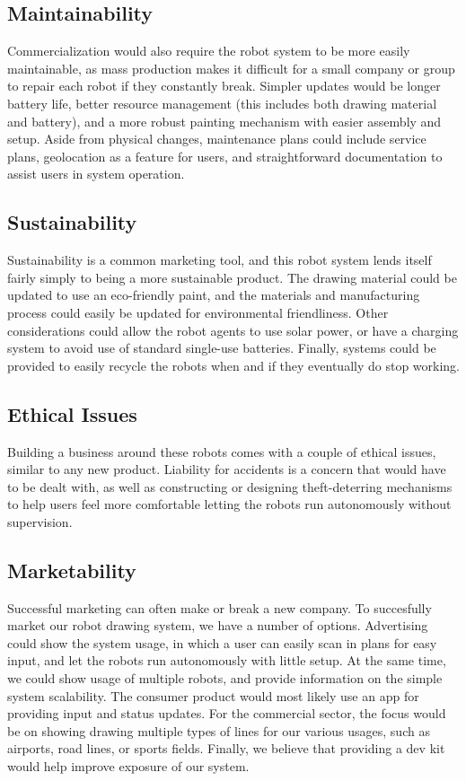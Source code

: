 \subsection{Maintainability}
Commercialization would also require the robot system to be more easily maintainable, as mass production makes it difficult for a small company or group to repair each robot if they constantly break. Simpler updates would be longer battery life, better resource management (this includes both drawing material and battery), and a more robust painting mechanism with easier assembly and setup. Aside from physical changes, maintenance plans could include service plans, geolocation as a feature for users, and straightforward documentation to assist users in system operation.

\subsection{Sustainability}
Sustainability is a common marketing tool, and this robot system lends itself fairly simply to being a more sustainable product. The drawing material could be updated to use an eco-friendly paint, and the materials and manufacturing process could easily be updated for environmental friendliness. Other considerations could allow the robot agents to use solar power, or have a charging system to avoid use of standard single-use batteries. Finally, systems could be provided to easily recycle the robots when and if they eventually do stop working.

\subsection{Ethical Issues}
Building a business around these robots comes with a couple of ethical issues, similar to any new product. Liability for accidents is a concern that would have to be dealt with, as well as constructing or designing theft-deterring mechanisms to help users feel more comfortable letting the robots run autonomously without supervision.

\subsection{Marketability}
Successful marketing can often make or break a new company. To succesfully market our robot drawing system, we have a number of options. Advertising could show the system usage, in which a user can easily scan in plans for easy input, and let the robots run autonomously with little setup. At the same time, we could show usage of multiple robots, and provide information on the simple system scalability. The consumer product would most likely use an app for providing input and status updates. For the commercial sector, the focus would be on showing drawing multiple types of lines for our various usages, such as airports, road lines, or sports fields. Finally, we believe that providing a dev kit would help improve exposure of our system.

